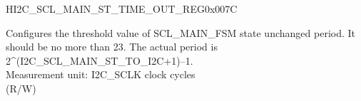     \begin{register}{H}{I2C\_SCL\_MAIN\_ST\_TIME\_OUT\_REG}{0x007C}\label{regdesc:I2CSCLMAINSTTIMEOUTREG}
    \regnewline%
    \begin{regdesc}\begin{reglist}
    \label{fielddesc:I2CSCLMAINSTTOI2C}\item [I2C\_SCL\_MAIN\_ST\_TO\_I2C] Configures the threshold value of SCL\_MAIN\_FSM state unchanged period. It should be no more than 23. The actual period is 2\^{}(I2C\_SCL\_MAIN\_ST\_TO\_I2C+1)–1.\\
    Measurement unit: I2C\_SCLK clock cycles \\ (R/W)
    \end{reglist}\end{regdesc}
    \end{register}


